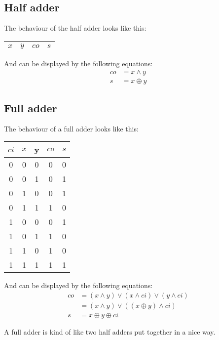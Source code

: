 \documentclass[11pt,a4paper,titlepage,dvipsnames,cmyk]{scrartcl}
\begin{document}
\subsection{Half adder}%
\label{sub:half}
The behaviour of the half adder looks like this:
\begin{center}
    \begin{tabular}{|c c|c|c|}
        \hline
        $x$ & $y$ & $co$ & $s$ \\ \hline
    \end{tabular}
\end{center}

And can be displayed by the following equations:
\begin{align*}
    co &= x \wedge y \\
    s &= x \oplus y
\end{align*}

\subsection{Full adder}%
\label{sub:full}
The behaviour of a full adder looks like this:
\begin{center}
    \begin{tabular}{|c c c|c|c|}
        \hline
        $ci$ & $x$ & y & $co$ & $s$ \\ \hline
        0 & 0 & 0 & 0 & 0 \\ \hline
        0 & 0 & 1 & 0 & 1 \\ \hline
        0 & 1 & 0 & 0 & 1 \\ \hline
        0 & 1 & 1 & 1 & 0 \\ \hline
        1 & 0 & 0 & 0 & 1 \\ \hline
        1 & 0 & 1 & 1 & 0 \\ \hline
        1 & 1 & 0 & 1 & 0 \\ \hline
        1 & 1 & 1 & 1 & 1 \\ \hline
    \end{tabular}
\end{center}

And can be displayed by the following equations:
\begin{align*}
    co &= (x \wedge y) \vee (x \wedge ci) \vee (y \wedge ci) \\
       &= (x \wedge y) \vee ((x \oplus y) \wedge ci) \\
    s &= x \oplus y \oplus ci
\end{align*}

A full adder is kind of like two half adders put together in a nice way.
\end{document}

